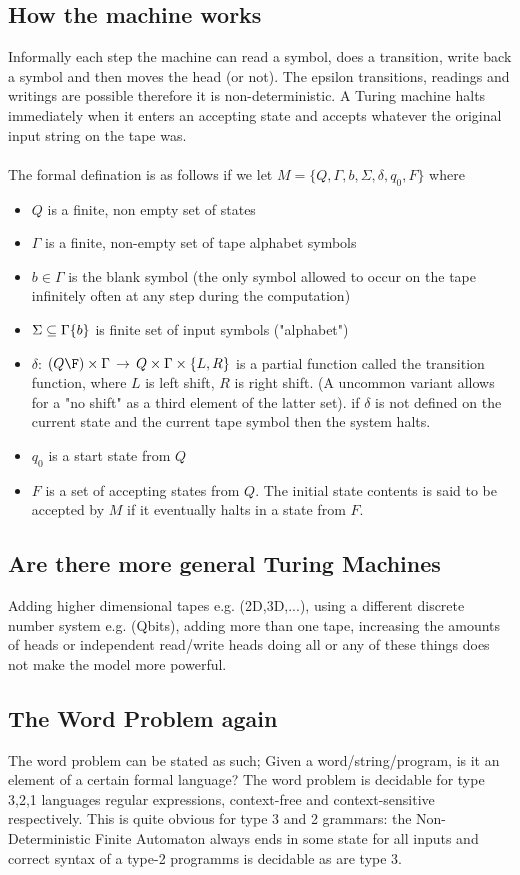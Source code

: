 \subsection{How the machine works}
Informally each step the machine can read a symbol, does a transition, write back a symbol and then moves the head (or not). The epsilon transitions, readings and writings are possible therefore it is non-deterministic. A Turing machine halts immediately when it enters an accepting state and accepts whatever the original input string on the tape was. 
\\\\
The formal defination is as follows if we let $M = \{Q,\Gamma,b,\Sigma,\delta,q_0,F\}$ where 
\begin{itemize}
    \item $Q$ is a finite, non empty set of states
    \item $\Gamma$ is a finite, non-empty set of tape alphabet symbols  
    \item $b \in \Gamma$ is the blank symbol (the only symbol allowed to occur on the tape infinitely often at any step during the computation) 
    \item $\Sigma \subseteq \Gamma\\\{b\}$ is finite set of input symbols ("alphabet")
    \item $\delta$: $(Q\F)\times\Gamma\,\rightarrow\,Q\times\Gamma\times\{L,R\}$ is a partial function called the transition function, where $L$ is left shift, $R$ is right shift. (A uncommon variant allows for a "no shift" as a third element of the latter set). if $\delta$ is not defined on the current state and the current tape symbol then the system halts.
    \item $q_0$ is a start state from $Q$
    \item $F$ is a set of accepting states from $Q$. The initial state contents is said to be accepted by $M$ if it eventually halts in a state from $F$.
\end{itemize} 
\subsection{Are there more general Turing Machines}
Adding higher dimensional tapes e.g. (2D,3D,...), using a different discrete number system e.g. (Qbits), adding more than one tape, increasing the amounts of heads or independent read/write heads doing all or any of these things does not make the model more powerful.
\subsection{The Word Problem again}
The word problem can be stated as such; Given a word/string/program, is it an element of a certain formal language? The word problem is decidable for type 3,2,1 languages regular expressions, context-free and context-sensitive respectively. This is quite obvious for type 3 and 2 grammars: the Non-Deterministic Finite Automaton always ends in some state for all inputs and correct syntax of a type-2 programms is decidable as are type 3.
